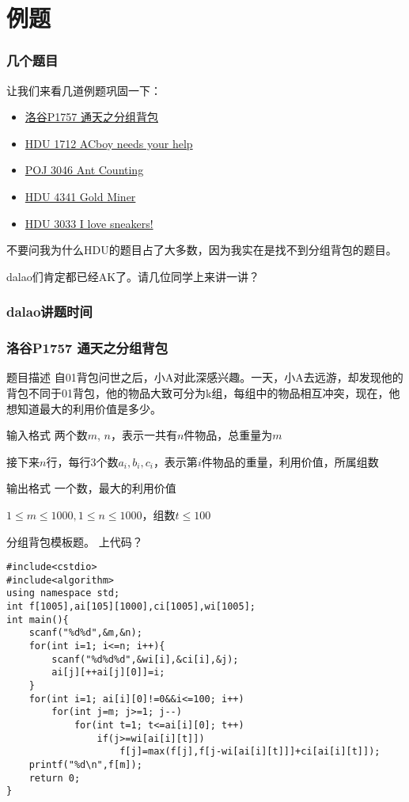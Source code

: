 \documentclass[UTF-8,aspectratio=1610]{ctexbeamer}
\begin{document}
\section{例题}
\begin{frame}
\frametitle{几个题目}
让我们来看几道例题巩固一下：
\begin{itemize}
\item{\href{https://www.luogu.org/problemnew/show?pid=1757}{洛谷P1757 通天之分组背包}}
\item{\href{http://acm.hdu.edu.cn/showproblem.php?pid=1712}{HDU 1712 ACboy needs your help}}
\item{\href{http://poj.org/problem?id=3046}{POJ 3046 Ant Counting}}
\item{\href{http://acm.hdu.edu.cn/showproblem.php?pid=4341}{HDU 4341 Gold Miner}}
\item{\href{http://acm.hdu.edu.cn/showproblem.php?pid=3033}{HDU 3033 I love sneakers!}}
\end{itemize}
\pause
不要问我为什么HDU的题目占了大多数，因为我实在是找不到分组背包的题目。\pause

dalao们肯定都已经AK了。请几位同学上来讲一讲？
\end{frame}
\begin{frame}
\frametitle{dalao讲题时间}
\end{frame}
\begin{frame}
\frametitle{洛谷P1757 通天之分组背包}
\begin{block}{题目描述}
自01背包问世之后，小A对此深感兴趣。一天，小A去远游，却发现他的背包不同于01背包，他的物品大致可分为k组，每组中的物品相互冲突，现在，他想知道最大的利用价值是多少。
\end{block}
\begin{alertblock}{输入格式}
两个数$m$, $n$，表示一共有$n$件物品，总重量为$m$

接下来$n$行，每行$3$个数$a_i,b_i,c_i$，表示第$i$件物品的重量，利用价值，所属组数
\end{alertblock}
\begin{exampleblock}{输出格式}
一个数，最大的利用价值

$1\leqslant m\leqslant 1000,1\leqslant n\leqslant 1000$，组数$t\leqslant 100$
\end{exampleblock}
\end{frame}
\begin{frame}[fragile]
分组背包模板题。\pause
上代码？\pause
\begin{verbatim}
#include<cstdio>
#include<algorithm>
using namespace std;
int f[1005],ai[105][1000],ci[1005],wi[1005];
int main(){
    scanf("%d%d",&m,&n);
    for(int i=1; i<=n; i++){
        scanf("%d%d%d",&wi[i],&ci[i],&j);
        ai[j][++ai[j][0]]=i;
    }
    for(int i=1; ai[i][0]!=0&&i<=100; i++)
        for(int j=m; j>=1; j--)
            for(int t=1; t<=ai[i][0]; t++)
                if(j>=wi[ai[i][t]])
                    f[j]=max(f[j],f[j-wi[ai[i][t]]]+ci[ai[i][t]]);
    printf("%d\n",f[m]);
    return 0;
}
\end{verbatim}
\end{frame}
\end{document}
